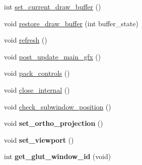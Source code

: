 \begin{DoxyCompactItemize}
\item 
int \hyperlink{class_g_l_u_i___main_a022e4708ab5f105fb49202b7dd28e7b4}{set\+\_\+current\+\_\+draw\+\_\+buffer} ()
\item 
void \hyperlink{class_g_l_u_i___main_a56523ef45aea9c350009c6d91a67a028}{restore\+\_\+draw\+\_\+buffer} (int buffer\+\_\+state)
\item 
void \hyperlink{class_g_l_u_i___main_acd1e25e989f0f1820c496d4b8b9ee422}{refresh} ()
\item 
void \hyperlink{class_g_l_u_i___main_a64302740a0fb9ca34de276d001fbd8bd}{post\+\_\+update\+\_\+main\+\_\+gfx} ()
\item 
void \hyperlink{class_g_l_u_i___main_aa3c49dcfbc912870344e9265354ad53a}{pack\+\_\+controls} ()
\item 
void \hyperlink{class_g_l_u_i___main_a3a6613342a97448cad9677d291165889}{close\+\_\+internal} ()
\item 
void \hyperlink{class_g_l_u_i___main_a8ca1f714c14dade8e6274112c69e5863}{check\+\_\+subwindow\+\_\+position} ()
\item 
\hypertarget{class_g_l_u_i___main_a3216ab4a380f2a904e152524f4687e29}{void {\bfseries set\+\_\+ortho\+\_\+projection} ()}\label{class_g_l_u_i___main_a3216ab4a380f2a904e152524f4687e29}

\item 
\hypertarget{class_g_l_u_i___main_a444621e91c377d33121f8bc95ed80d98}{void {\bfseries set\+\_\+viewport} ()}\label{class_g_l_u_i___main_a444621e91c377d33121f8bc95ed80d98}

\item 
\hypertarget{class_g_l_u_i___main_a8187156aa77f0f9b34660addf333ca79}{int {\bfseries get\+\_\+glut\+\_\+window\+\_\+id} (void)}\label{class_g_l_u_i___main_a8187156aa77f0f9b34660addf333ca79}

\end{DoxyCompactItemize}
